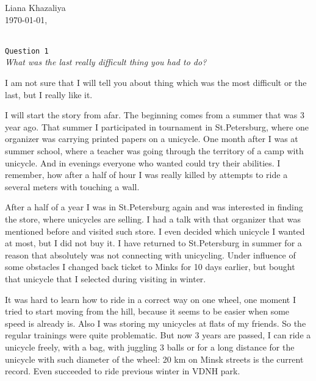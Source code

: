 \documentclass[10pt]{article}
\begin{document}
\def\chap#1#2{\ \\ {\large\bf#1 \ | \ \tt\scshape#2} \par}

{\bf
\begin{flushright}
\small{Liana Khazaliya\\  \today, \currenttime}
\end{flushright}}
\rm
\hline
\ \\[0.2 cm]
{\large\texttt{Question 1}}
\\
\textit{What was the last really difficult thing you had to do?}
\ \\[0.3cm]
\medskip\par I am not sure that I will tell you about thing which was the most difficult or the last, but I really like it.  
\medskip\par I will start the story from afar. The beginning comes from a summer that was 3 year ago. That summer I participated in tournament in St.Petersburg, where one organizer was carrying printed papers on a unicycle. One month after I was at summer school, where a teacher was going through the territory of a camp with unicycle. And in evenings everyone who wanted could try their abilities. I remember, how after a half of hour I was really killed by attempts to ride a several meters with touching a wall.
\medskip\par  After a half of a year I was in St.Petersburg again and was interested in finding the store, where unicycles are selling. I had a talk with that organizer that was mentioned before and visited such store. I even decided which unicycle I wanted at most, but I did not buy it. I have returned to St.Petersburg in summer for a reason that absolutely was not connecting with unicycling. Under influence of some obstacles I changed back ticket to Minks for 10 days earlier, but bought that unicycle that I selected during visiting in winter.
\medskip\par It was hard to learn how to ride in a correct way on one wheel, one moment I tried to start moving from the hill, because it seems to be easier when some speed is already is. Also I was storing my unicycles at flats of my friends. So the regular trainings were quite problematic. But now 3 years are passed, I can ride a unicycle freely, with a bag, with juggling 3 balls or for a long distance for the unicycle with such diameter of the wheel: 20 km on Minsk streets is the current record. Even succeeded to ride previous winter in VDNH park.
\ \\[0.2 cm]
\end{document}
